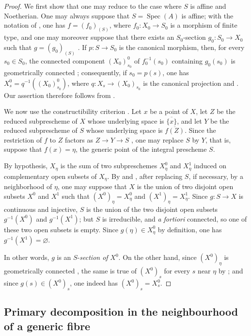 \begin{proof}
We first show that one may reduce to the case where $S$ is affine and Noetherian. One may always suppose that $S=\operatorname{Spec}(A)$ is affine; with the notation of , one has $f=(f_0)_{(S)}$, where $f_0:X_0\to S_0$ is a morphism of finite type, and one may moreover suppose that there exists an $S_0$-section $g_0:S_0\to X_0$ such that $g=(g_0)_{(S)}$ . If $p:S\to S_0$ is the canonical morphism, then, for every $s_0\in S_0$, the connected component $(X_0)^0_{s_0}$ of $f_0^{-1}(s_0)$ containing $g_0(s_0)$ is geometrically connected ; consequently, if $s_0=p(s)$, one has $X_s^0=q^{-1}((X_0)^0_{s_0})$, where $q:X_s\to (X_0)_{s_0}$ is the canonical projection  and . Our assertion therefore follows from .

We now use the constructibility criterion . Let $x$ be a point of $X$, let $Z$ be the reduced subprescheme of $X$ whose underlying space is $\overline{\{x\}}$, and let $Y$ be the reduced subprescheme of $S$ whose underlying space is $\overline{f(Z)}$. Since the restriction of $f$ to $Z$ factors as $Z\to Y\to S$ , one may replace $S$ by $Y$, that is, suppose that $f(x)=\eta$, the generic point of the integral prescheme $S$.

By hypothesis, $X_\eta$ is the sum of two subpreschemes $X_\eta^0$ and $X_\eta^1$ induced on complementary open subsets of $X_\eta$. By  and , after replacing $S$, if necessary, by a neighborhood of $\eta$, one may suppose that $X$ is the union of two disjoint open subsets $X^0$ and $X^1$ such that $(X^0)_\eta=X_\eta^0$ and $(X^1)_\eta=X_\eta^1$. Since $g:S\to X$ is continuous and injective, $S$ is the union of the two disjoint open subsets $g^{-1}(X^0)$ and $g^{-1}(X^1)$; but $S$ is irreducible, and \emph{a fortiori} connected, so one of these two open subsets is empty. Since $g(\eta)\in X_\eta^0$ by definition, one has $g^{-1}(X^1)=\varnothing$.

In other words, $g$ is an $S$-\emph{section of} $X^0$. On the other hand, since $(X^0)_\eta$ is geometrically connected , the same is true of $(X^0)_s$ for every $s$ near $\eta$ by ; and since $g(s)\in (X^0)_s$, one indeed has $(X^0)_s=X_s^0$.
\end{proof}

\subsection{Primary decomposition in the neighbourhood of a generic fibre}
\label{subsection:IV.9.8}
\label{IV.9.8}

